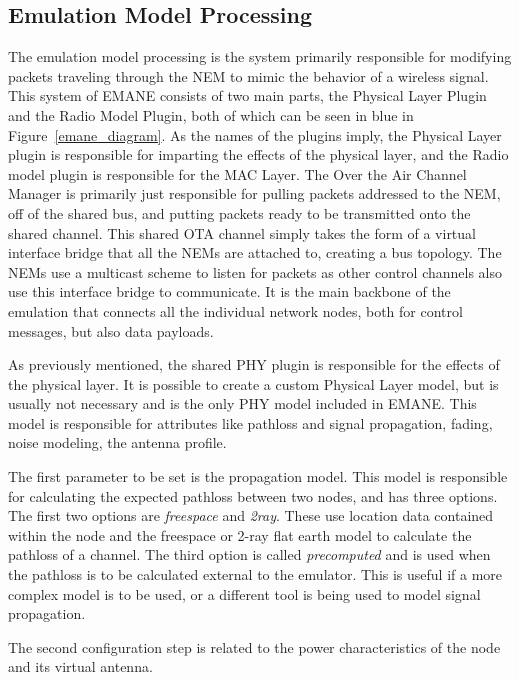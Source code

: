 \subsection{Emulation Model Processing}
The emulation model processing is the system primarily responsible for modifying packets traveling through the NEM to mimic the behavior of a wireless signal.
This system of EMANE consists of two main parts, the Physical Layer Plugin and the Radio Model Plugin, both of which can be seen in blue in Figure~\ref{emane_diagram}.
As the names of the plugins imply, the Physical Layer plugin is responsible for imparting the effects of the physical layer, and the Radio model plugin is responsible for the MAC Layer.
The Over the Air Channel Manager is primarily just responsible for pulling packets addressed to the NEM, off of the shared bus, and putting packets ready to be transmitted onto the shared channel.
This shared OTA channel simply takes the form of a virtual interface bridge that all the NEMs are attached to, creating a bus topology.
The NEMs use a multicast scheme to listen for packets as other control channels also use this interface bridge to communicate.
It is the main backbone of the emulation that connects all the individual network nodes, both for control messages, but also data payloads. \par
As previously mentioned, the shared PHY plugin is responsible for the effects of the physical layer.
It is possible to create a custom Physical Layer model, but is usually not necessary and is the only PHY model included in EMANE.
This model is responsible for attributes like pathloss and signal propagation, fading, noise modeling, the antenna profile. \par
The first parameter to be set is the propagation model.
This model is responsible for calculating the expected pathloss between two nodes, and has three options.
The first two options are \textit{freespace} and \textit{2ray}.
These use location data contained within the node and the freespace or 2-ray flat earth model to calculate the pathloss of a channel.
The third option is called \textit{precomputed} and is used when the pathloss is to be calculated external to the emulator.
This is useful if a more complex model is to be used, or a different tool is being used to model signal propagation. \par
The second configuration step is related to the power characteristics of the node and its virtual antenna.
